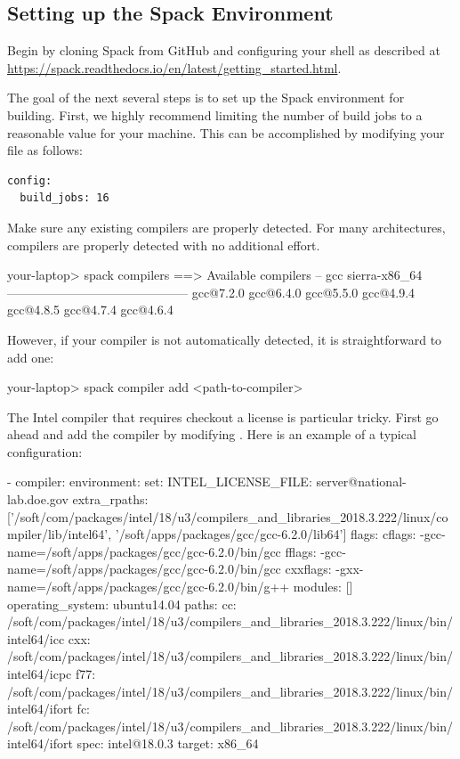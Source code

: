 \subsection{Setting up the Spack Environment}
Begin by cloning Spack from GitHub and configuring your shell as described at 
\url{https://spack.readthedocs.io/en/latest/getting_started.html}.

The goal of the next several steps is to set up the Spack environment
for building. First, we highly recommend limiting the number of build jobs to
a reasonable value for your machine. This can be
accomplished by modifying your  file as follows:

\begin{lstlisting}[style=SHELL]
config:
  build_jobs: 16
\end{lstlisting}

Make sure any existing compilers are properly detected. For many
architectures, compilers are properly detected with no additional
effort.

\begin{shade}
your-laptop> spack compilers
==> Available compilers
-- gcc sierra-x86_64 --------------------------------------------
gcc@7.2.0  gcc@6.4.0  gcc@5.5.0  gcc@4.9.4  gcc@4.8.5  gcc@4.7.4  gcc@4.6.4
\end{shade}

However, if your compiler is not automatically detected, it is straightforward
to add one:

\begin{shade}
your-laptop> spack compiler add <path-to-compiler>
\end{shade}

The Intel compiler that requires checkout a license is particular
tricky. First go ahead and add the compiler by modifying
. Here is an example of a typical configuration:
\begin{shade}
- compiler:
    environment:
      set:
        INTEL_LICENSE_FILE: server@national-lab.doe.gov
    extra_rpaths:  ['/soft/com/packages/intel/18/u3/compilers_and_libraries_2018.3.222/linux/compiler/lib/intel64',
    '/soft/apps/packages/gcc/gcc-6.2.0/lib64']
    flags: 
      cflags: -gcc-name=/soft/apps/packages/gcc/gcc-6.2.0/bin/gcc
      fflags: -gcc-name=/soft/apps/packages/gcc/gcc-6.2.0/bin/gcc
      cxxflags: -gxx-name=/soft/apps/packages/gcc/gcc-6.2.0/bin/g++
    modules: []
    operating_system: ubuntu14.04
    paths:
      cc: /soft/com/packages/intel/18/u3/compilers_and_libraries_2018.3.222/linux/bin/intel64/icc
      cxx: /soft/com/packages/intel/18/u3/compilers_and_libraries_2018.3.222/linux/bin/intel64/icpc
      f77: /soft/com/packages/intel/18/u3/compilers_and_libraries_2018.3.222/linux/bin/intel64/ifort
      fc: /soft/com/packages/intel/18/u3/compilers_and_libraries_2018.3.222/linux/bin/intel64/ifort
    spec: intel@18.0.3
    target: x86_64
\end{shade}

